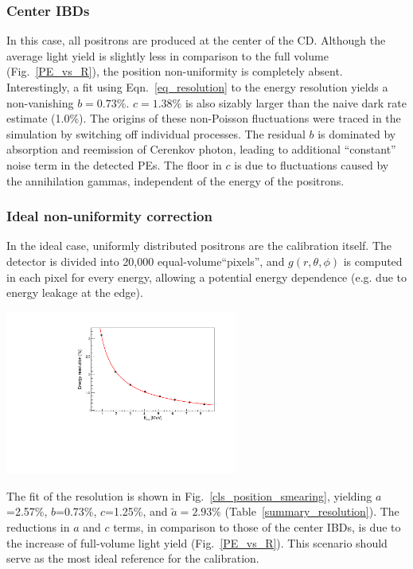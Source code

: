 \documentclass[a4paper,10pt,twoside]{cpc-hepnp}
\begin{document}
\begin{CJK*}{GB}{gbsn}
\begin{multicols}{2}
\subsubsection{Center IBDs}
In this case, all positrons are produced at the center of the
CD. Although the average light yield is slightly less in comparison to
the full volume (Fig.~\ref{PE_vs_R}), the position non-uniformity is
completely absent. Interestingly, a fit using Eqn.~\ref{eq_resolution}
to the energy resolution yields a non-vanishing $b=0.73\%$. $c =
1.38\%$ is also sizably larger than the naive dark rate estimate
(1.0\%).  The origins of these non-Poisson fluctuations were traced in
the simulation by switching off individual processes. The residual $b$
is dominated by absorption and reemission of Cerenkov photon, leading
to additional ``constant'' noise term in the detected PEs. 
The floor in $c$ is due to fluctuations caused by the annihilation gammas,
independent of the energy of the positrons.

\subsubsection{Ideal non-uniformity correction}
In the ideal case, uniformly distributed positrons are the calibration
itself. 
The detector is divided into 20,000 equal-volume``pixels'', and
$g(r,\theta,\phi)$ is computed in each pixel for every energy,
allowing a potential energy dependence (e.g. due to energy leakage at
the edge).
\begin{center}
	\centering
	\includegraphics[width=3in]{EnergyRes.pdf}
	\label{cls_position_smearing}
\end{center}
The fit of the resolution is shown in
Fig.~\ref{cls_position_smearing}, yielding 
$a$=2.57\%, $b$=0.73\%, $c$=1.25\%, and $\tilde{a}=2.93\%$
(Table~\ref{summary_resolution}). The reductions in $a$ and $c$ terms,
in comparison to those of the center IBDs, is due to the increase of
full-volume light yield (Fig.~\ref{PE_vs_R}). This scenario should
serve as the most ideal reference for the calibration.


\end{multicols}
\end{CJK*}
\end{document}
